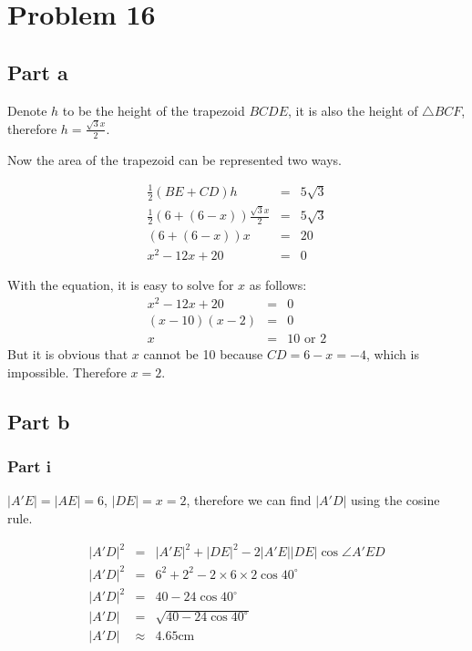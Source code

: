 \section*{Problem 16}
\subsection*{Part a}
Denote $ h $ to be the height of the trapezoid $ BCDE $, it is also the height of $ \triangle BCF $, therefore $ h = \frac{\sqrt{3}x}{2} $.

Now the area of the trapezoid can be represented two ways.

\begin{eqnarray*}
                      \frac{1}{2}(BE + CD)h &=& 5\sqrt{3} \\
  \frac{1}{2}(6 + (6-x))\frac{\sqrt{3}x}{2} &=& 5\sqrt{3} \\
                               (6 + (6-x))x &=& 20        \\
                             x^2 - 12x + 20 &=& 0
\end{eqnarray*}

With the equation, it is easy to solve for $ x $ as follows:
\begin{eqnarray*}
    x^2 - 12x + 20 &=& 0 \\
    (x - 10)(x - 2) &=& 0 \\
                 x &=& 10 \text{ or } 2
\end{eqnarray*}
But it is obvious that $ x $ cannot be 10 because $ CD = 6 - x = -4 $, which is impossible. Therefore $ x = 2 $.

\subsection*{Part b}
\subsubsection*{Part i}
$ |A'E| = |AE| = 6 $, $ |DE| = x = 2 $, therefore we can find $ |A'D| $ using the cosine rule.

\begin{eqnarray*}
  |A'D|^2 &=& |A'E|^2 + |DE|^2 - 2|A'E||DE| \cos \angle A'ED \\
  |A'D|^2 &=& 6^2 + 2^2 - 2 \times 6 \times 2 \cos 40^\circ \\
    |A'D|^2 &=& 40 - 24 \cos 40^\circ \\
        |A'D| &=& \sqrt{40 - 24 \cos 40^\circ} \\
        |A'D| & \approx & 4.65 \text{cm}
\end{eqnarray*}


